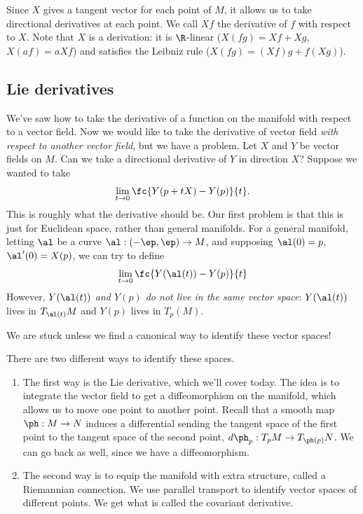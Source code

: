 Since $X$ gives a tangent vector for each point of $M$, it allows us to take directional derivatives at each point.
We call $Xf$ the derivative of $f$ with respect to $X$. Note that $X$ is a derivation: it is $\R$-linear ($X(fg)=Xf+Xg$, $X(af)=aXf$) and satisfies the Leibniz rule ($X(fg)=(Xf)g+f(Xg)$).

\subsection{Lie derivatives}

We've saw how to take the derivative of a function on the manifold with respect to a vector field. Now we would like to take the derivative of vector field {\it with respect to another vector field}, but we have a problem. Let $X$ and $Y$ be vector fields on $M$. Can we take a directional derivative of $Y$ in direction $X$? Suppose we wanted to take
\[
\lim_{t\to 0} \fc{Y(p+tX)-Y(p)}{t}.
\]
This is roughly what the derivative should be. Our first problem is that this is just for Euclidean space, rather than general manifolds. For a general manifold, letting $\al$ be a curve $\al:(-\ep,\ep)\to M$, and supposing $\al(0)=p$, $\al'(0)=X(p)$, we can try to define
\[
\lim_{t\to 0} \fc{Y(\al(t))-Y(p)}{t}
\]
However, {\it $Y(\al(t))$ and $Y(p)$ do not live in the same vector space}: $Y(\al(t))$ lives in $T_{\al(t)}M$ and $Y(p)$ lives in $T_p(M)$. %

We are stuck unless we find a canonical way to identify these vector spaces!

There are two different ways to identify these spaces. 
\begin{enumerate}
\item
The first way is the Lie derivative, which we'll cover today. The idea is to integrate the vector field to get a diffeomorphism on the manifold, which allows us to move one point to another point. Recall that a smooth map $\ph:M\to N$ induces a differential sending the tangent space of the first point to the tangent space of the second point, $d\ph_p:T_pM\to T_{\ph(p)}N$. We can go back as well, since we have a diffeomorphism.
\item 
The second way is to equip the manifold with extra structure, called a Riemannian connection. We use parallel transport to identify vector spaces of different points. We get what is called the covariant derivative. 
\end{enumerate}

